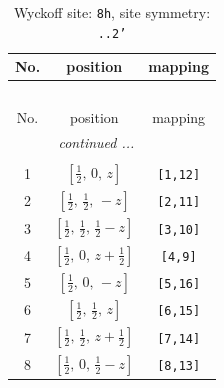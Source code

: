 \documentclass[fleqn,8pt]{jsarticle}
\begin{document}
\begin{longtable}{ccc}
\caption{Wyckoff site: {\tt 8h}, site symmetry: {\tt ..2'}}
 \\
 \hline \hline
No. & position & mapping \\ \hline \endfirsthead

\multicolumn{2}{l}{\tablename\ \thetable{}} \\
 \hline \hline
No. & position & mapping \\ \hline \endhead

 \hline \hline
\multicolumn{2}{r}{\footnotesize\it continued ...} \\ \endfoot

 \hline \hline
\multicolumn{2}{r}{} \\ \endlastfoot

1 & $\left[ \frac{1}{2},\, 0,\, z \right]$ & {\tt [1,12]} \\ \hline
2 & $\left[ \frac{1}{2},\, \frac{1}{2},\, - z \right]$ & {\tt [2,11]} \\ \hline
3 & $\left[ \frac{1}{2},\, \frac{1}{2},\, \frac{1}{2} - z \right]$ & {\tt [3,10]} \\ \hline
4 & $\left[ \frac{1}{2},\, 0,\, z + \frac{1}{2} \right]$ & {\tt [4,9]} \\ \hline
5 & $\left[ \frac{1}{2},\, 0,\, - z \right]$ & {\tt [5,16]} \\ \hline
6 & $\left[ \frac{1}{2},\, \frac{1}{2},\, z \right]$ & {\tt [6,15]} \\ \hline
7 & $\left[ \frac{1}{2},\, \frac{1}{2},\, z + \frac{1}{2} \right]$ & {\tt [7,14]} \\ \hline
8 & $\left[ \frac{1}{2},\, 0,\, \frac{1}{2} - z \right]$ & {\tt [8,13]} \\
\end{longtable}
\renewcommand{\arraystretch}{1.2}
\end{document}
